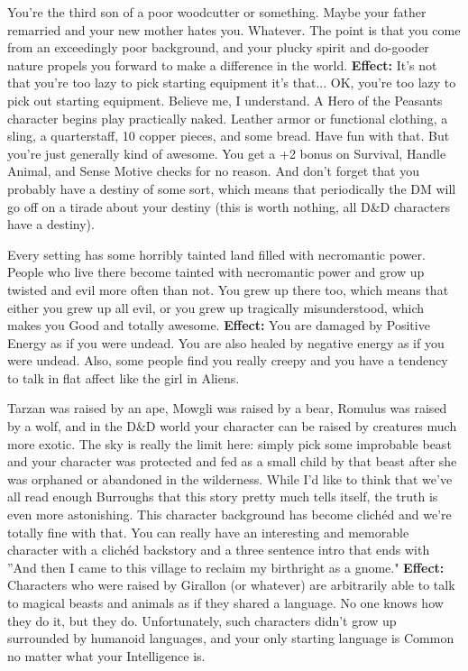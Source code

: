 \medskip{}
{You're the third son of a poor woodcutter or something. Maybe your father remarried and your new mother hates you. Whatever. The point is that you come from an exceedingly poor background, and your plucky spirit and do-gooder nature propels you forward to make a difference in the world.}
\textbf{Effect:}{ It's not that you're too lazy to pick starting equipment it's that... OK, you're too lazy to pick out starting equipment. Believe me, I understand. A Hero of the Peasants character begins play practically naked. Leather armor or functional clothing, a sling, a quarterstaff, 10 copper pieces, and some bread. Have fun with that. But you're just generally kind of awesome. You get a +2 bonus on Survival, Handle Animal, and Sense Motive checks for no reason. And don't forget that you probably have a destiny of some sort, which means that periodically the DM will go off on a tirade about your destiny (this is worth nothing, all D\&D characters have a destiny).}

\medskip{}
{Every setting has some horribly tainted land filled with necromantic power. People who live there become tainted with necromantic power and grow up twisted and evil more often than not. You grew up there too, which means that either you grew up all evil, or you grew up tragically misunderstood, which makes you Good and totally awesome.}
\textbf{Effect:}{ You are damaged by Positive Energy as if you were undead. You are also healed by negative energy as if you were undead. Also, some people find you really creepy and you have a tendency to talk in flat affect like the girl in Aliens.}

\medskip{}
{Tarzan was raised by an ape, Mowgli was raised by a bear, Romulus was raised by a wolf, and in the D\&D world your character can be raised by creatures much more exotic. The sky is really the limit here: simply pick some improbable beast and your character was protected and fed as a small child by that beast after she was orphaned or abandoned in the wilderness. While I'd like to think that we've all read enough Burroughs that this story pretty much tells itself, the truth is even more astonishing. This character background has become clich\'ed and we're totally fine with that. You can really have an interesting and memorable character with a clich\'ed backstory and a three sentence intro that ends with ''And then I came to this village to reclaim my birthright as a gnome."}
\textbf{Effect:}{ Characters who were raised by Girallon (or whatever) are arbitrarily able to talk to magical beasts and animals as if they shared a language. No one knows how they do it, but they do. Unfortunately, such characters didn't grow up surrounded by humanoid languages, and your only starting language is Common no matter what your Intelligence is.}

